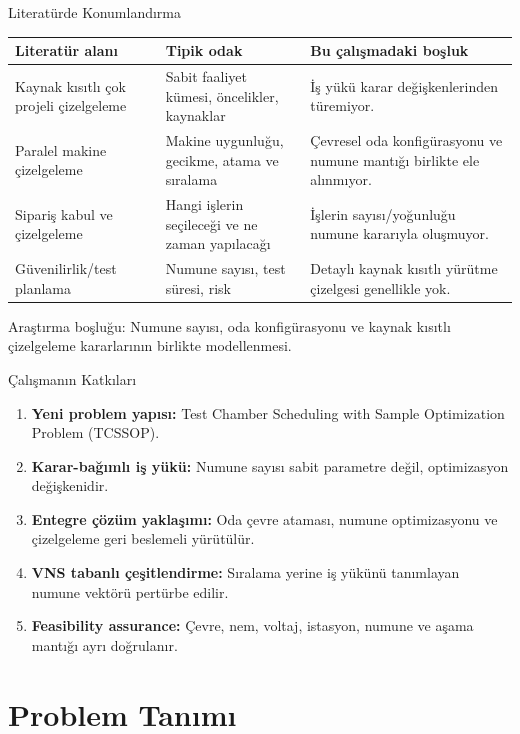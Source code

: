 \documentclass[aspectratio=169,11pt]{beamer}
\newcommand{\tcssop}{\textsc{TCSSOP}}
\begin{document}
\begin{frame}{Literatürde Konumlandırma}
  \begin{tabularx}{\textwidth}{p{}Y Y}
    \toprule
    \textbf{Literatür alanı} & \textbf{Tipik odak} & \textbf{Bu çalışmadaki boşluk} \\
    \midrule
    Kaynak kısıtlı çok projeli çizelgeleme & Sabit faaliyet kümesi, öncelikler, kaynaklar & İş yükü karar değişkenlerinden türemiyor. \\
    \addlinespace
    Paralel makine çizelgeleme & Makine uygunluğu, gecikme, atama ve sıralama & Çevresel oda konfigürasyonu ve numune mantığı birlikte ele alınmıyor. \\
    \addlinespace
    Sipariş kabul ve çizelgeleme & Hangi işlerin seçileceği ve ne zaman yapılacağı & İşlerin sayısı/yoğunluğu numune kararıyla oluşmuyor. \\
    \addlinespace
    Güvenilirlik/test planlama & Numune sayısı, test süresi, risk & Detaylı kaynak kısıtlı yürütme çizelgesi genellikle yok. \\
    \bottomrule
  \end{tabularx}

  \vspace{3mm}
  \alert{Araştırma boşluğu:} Numune sayısı, oda konfigürasyonu ve kaynak kısıtlı çizelgeleme kararlarının birlikte modellenmesi.
\end{frame}

\begin{frame}{Çalışmanın Katkıları}
  \begin{enumerate}
    \item \textbf{Yeni problem yapısı:} Test Chamber Scheduling with Sample Optimization Problem (\tcssop).
    \item \textbf{Karar-bağımlı iş yükü:} Numune sayısı sabit parametre değil, optimizasyon değişkenidir.
    \item \textbf{Entegre çözüm yaklaşımı:} Oda çevre ataması, numune optimizasyonu ve çizelgeleme geri beslemeli yürütülür.
    \item \textbf{VNS tabanlı çeşitlendirme:} Sıralama yerine iş yükünü tanımlayan numune vektörü pertürbe edilir.
    \item \textbf{Feasibility assurance:} Çevre, nem, voltaj, istasyon, numune ve aşama mantığı ayrı doğrulanır.
  \end{enumerate}
\end{frame}

\section{Problem Tanımı}
\end{document}
